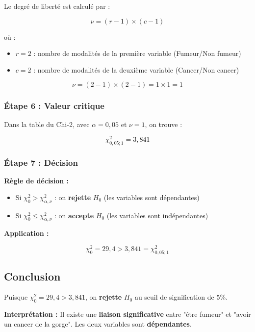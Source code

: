 \documentclass[11pt,a4paper]{article}
\begin{document}
Le degré de liberté est calculé par :

$$\nu = (r - 1) \times (c - 1)$$

où :
\begin{itemize}
    \item $r = 2$ : nombre de modalités de la première variable (Fumeur/Non fumeur)
    \item $c = 2$ : nombre de modalités de la deuxième variable (Cancer/Non cancer)
\end{itemize}

$$\nu = (2 - 1) \times (2 - 1) = 1 \times 1 = 1$$

\subsubsection{Étape 6 : Valeur critique}

Dans la table du Chi-2, avec $\alpha = 0,05$ et $\nu = 1$, on trouve :

$$\chi_{0,05;1}^2 = 3,841$$

\subsubsection{Étape 7 : Décision}

\begin{astucebox}
\textbf{Règle de décision :}
\begin{itemize}
    \item Si $\chi_0^2 > \chi_{\alpha,\nu}^2$ : on \textbf{rejette} $H_0$ (les variables sont dépendantes)
    \item Si $\chi_0^2 \leq \chi_{\alpha,\nu}^2$ : on \textbf{accepte} $H_0$ (les variables sont indépendantes)
\end{itemize}
\end{astucebox}

\textbf{Application :}

$$\chi_0^2 = 29,4 > 3,841 = \chi_{0,05;1}^2$$

\subsection{Conclusion}

Puisque $\chi_0^2 = 29,4 > 3,841$, on \textbf{rejette} $H_0$ au seuil de signification de 5\%.

\textbf{Interprétation :} Il existe une \textbf{liaison significative} entre "être fumeur" et "avoir un cancer de la gorge". Les deux variables sont \textbf{dépendantes}.
\end{document}
